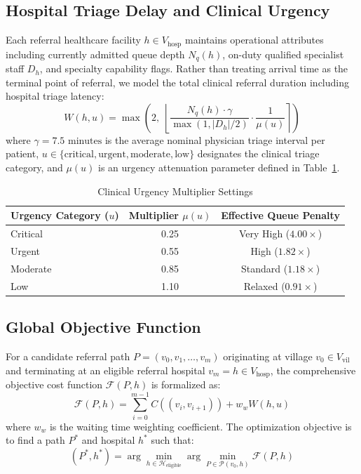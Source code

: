 \documentclass[conference]{IEEEtran}
\begin{document}
\subsection{Hospital Triage Delay and Clinical Urgency}
Each referral healthcare facility $h \in V_{\text{hosp}}$ maintains operational attributes including currently admitted queue depth $N_q(h)$, on-duty qualified specialist staff $D_h$, and specialty capability flags. Rather than treating arrival time as the terminal point of referral, we model the total clinical referral duration including hospital triage latency:
\begin{equation}
W(h, u) = \max \left( 2, \; \left\lfloor \frac{N_q(h) \cdot \gamma}{\max(1, |D_h| / 2)} \cdot \frac{1}{\mu(u)} \right\rceil \right)
\label{eq:hospital_wait}
\end{equation}
where $\gamma = 7.5\text{ minutes}$ is the average nominal physician triage interval per patient, $u \in \{\text{critical}, \text{urgent}, \text{moderate}, \text{low}\}$ designates the clinical triage category, and $\mu(u)$ is an urgency attenuation parameter defined in Table~\ref{tab:urgency}.

\begin{table}[htbp]
\caption{Clinical Urgency Multiplier Settings}
\begin{center}
\begin{tabular}{lcc}
\toprule
\textbf{Urgency Category ($u$)} & \textbf{Multiplier $\mu(u)$} & \textbf{Effective Queue Penalty} \\
\midrule
Critical & 0.25 & Very High ($4.00 \times$) \\
Urgent & 0.55 & High ($1.82 \times$) \\
Moderate & 0.85 & Standard ($1.18 \times$) \\
Low & 1.10 & Relaxed ($0.91 \times$) \\
\bottomrule
\end{tabular}
\label{tab:urgency}
\end{center}
\end{table}

\subsection{Global Objective Function}
For a candidate referral path $P = (v_0, v_1, \dots, v_m)$ originating at village $v_0 \in V_{\text{vil}}$ and terminating at an eligible referral hospital $v_m = h \in V_{\text{hosp}}$, the comprehensive objective cost function $\mathcal{F}(P, h)$ is formalized as:
\begin{equation}
\mathcal{F}(P, h) = \sum_{i=0}^{m-1} C((v_i, v_{i+1})) + w_w W(h, u)
\label{eq:global_cost}
\end{equation}
where $w_w$ is the waiting time weighting coefficient. The optimization objective is to find a path $P^*$ and hospital $h^*$ such that:
\begin{equation}
(P^*, h^*) = \arg\min_{h \in \mathcal{H}_{\text{eligible}}} \arg\min_{P \in \mathcal{P}(v_0, h)} \mathcal{F}(P, h)
\end{equation}
\end{document}
